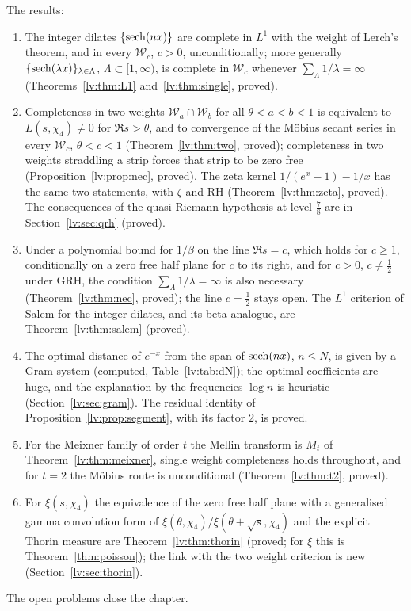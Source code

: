 The results:
\begin{enumerate}
\item The integer dilates $\{\operatorname{sech}(nx)\}$ are complete in $L^1$ with the weight of Lerch's theorem, and in every $\mathcal W_c$, $c>0$, unconditionally; more generally $\{\operatorname{sech}(\lambda x)\}_{\lambda\in\Lambda}$, $\Lambda\subset[1,\infty)$, is complete in $\mathcal W_c$ whenever $\sum_\Lambda1/\lambda=\infty$ (Theorems~\ref{lv:thm:L1} and~\ref{lv:thm:single}, proved).
\item Completeness in two weights $\mathcal W_a\cap\mathcal W_b$ for all $\theta<a<b<1$ is equivalent to $L(s,\chi_4)\ne0$ for $\Re s>\theta$, and to convergence of the M\"obius secant series in every $\mathcal W_c$, $\theta<c<1$ (Theorem~\ref{lv:thm:two}, proved); completeness in two weights straddling a strip forces that strip to be zero free (Proposition~\ref{lv:prop:nec}, proved). The zeta kernel $1/(e^x-1)-1/x$ has the same two statements, with $\zeta$ and RH (Theorem~\ref{lv:thm:zeta}, proved). The consequences of the quasi Riemann hypothesis at level $\frac78$ are in Section~\ref{lv:sec:qrh} (proved).
\item Under a polynomial bound for $1/\beta$ on the line $\Re s=c$, which holds for $c\ge1$, conditionally on a zero free half plane for $c$ to its right, and for $c>0$, $c\ne\frac12$ under GRH, the condition $\sum_\Lambda1/\lambda=\infty$ is also necessary (Theorem~\ref{lv:thm:nec}, proved); the line $c=\frac12$ stays open. The $L^1$ criterion of Salem for the integer dilates, and its beta analogue, are Theorem~\ref{lv:thm:salem} (proved).
\item The optimal distance of $e^{-x}$ from the span of $\operatorname{sech}(nx)$, $n\le N$, is given by a Gram system (computed, Table~\ref{lv:tab:dN}); the optimal coefficients are huge, and the explanation by the frequencies $\log n$ is heuristic (Section~\ref{lv:sec:gram}). The residual identity of Proposition~\ref{lv:prop:segment}, with its factor $2$, is proved.
\item For the Meixner family of order $t$ the Mellin transform is $M_t$ of Theorem~\ref{lv:thm:meixner}, single weight completeness holds throughout, and for $t=2$ the M\"obius route is unconditional (Theorem~\ref{lv:thm:t2}, proved).
\item For $\xi(s,\chi_4)$ the equivalence of the zero free half plane with a generalised gamma convolution form of $\xi(\theta,\chi_4)/\xi(\theta+\sqrt s,\chi_4)$ and the explicit Thorin measure are Theorem~\ref{lv:thm:thorin} (proved; for $\xi$ this is Theorem~\ref{thm:poisson}); the link with the two weight criterion is new (Section~\ref{lv:sec:thorin}).
\end{enumerate}
The open problems close the chapter.
